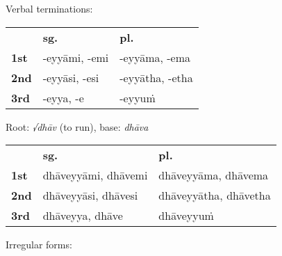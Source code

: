 \documentclass[11pt,oneside]{memoir}
\begin{document}
{\centering\par
\begin{multicols}{2}

Verbal terminations:

\begin{center}
\begin{tabular}{lll}
 & \textbf{sg.} & \textbf{pl.}\\[0pt]
\textbf{1st} & -eyyāmi, -emi & -eyyāma, -ema\\[0pt]
\textbf{2nd} & -eyyāsi, -esi & -eyyātha, -etha\\[0pt]
\textbf{3rd} & -eyya, -e & -eyyuṁ\\[0pt]
\end{tabular}
\end{center}

\columnbreak

Root: \emph{√dhāv} (to run), base: \emph{dhāva}

\begin{center}
\begin{tabular}{lll}
 & \textbf{sg.} & \textbf{pl.}\\[0pt]
\textbf{1st} & dhāveyyāmi, dhāvemi & dhāveyyāma, dhāvema\\[0pt]
\textbf{2nd} & dhāveyyāsi, dhāvesi & dhāveyyātha, dhāvetha\\[0pt]
\textbf{3rd} & dhāveyya, dhāve & dhāveyyuṁ\\[0pt]
\end{tabular}
\end{center}

\end{multicols}
\par}

Irregular forms:
\end{document}
